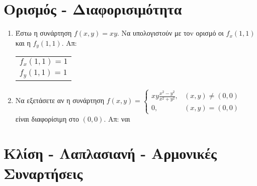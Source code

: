 



\pagestyle{askhseis}
\everymath{\displaystyle}



\begin{center}
  \minibox{\large\bfseries \textcolor{Col1}{Ασκήσεις στις Μερικές Παραγώγους 2}}
\end{center}

\section*{Ορισμός - Διαφορισιμότητα}

\begin{enumerate}
  \item Έστω η συνάρτηση $ f(x,y) = xy $. Να υπολογιστούν με τοv ορισμό οι 
    $ f_{x}(1,1) $ και η $ f_{y}(1,1) $. 
    \hfill Απ: 
    \begin{tabular}{l}
      $f_{x}(1,1) = 1$ \\
      $f_{y}(1,1) = 1$
    \end{tabular} 


  \item Να εξετάσετε αν η συνάρτηση 
    $
    f(x,y) = 
    \begin{cases} 
      xy \frac{x^{2}-y^{2}}{x^{2}+y^{2}}, & (x,y) 
      \neq (0,0) \\ 
      0, & (x,y) = (0,0)
    \end{cases}
    $ 
    είναι διαφορίσιμη στο $ (0,0) $. 
    \hfill Απ: ναι 
\end{enumerate}

\section*{Κλίση - Λαπλασιανή - Αρμονικές Συναρτήσεις}

